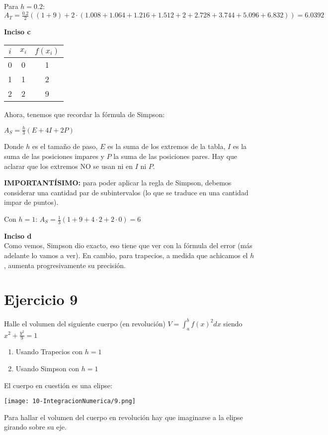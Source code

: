 \documentclass[11pt]{article}
\begin{document}
	Para $h=0.2$: $\displaystyle A_T=\frac{0.2}{2}((1+9)+2\cdot(1.008+1.064+1.216+1.512+2+2.728+3.744+5.096+6.832))=6.0392$
	
	\textbf{Inciso c}\\
	\begin{tabular}{|c|c|c|}
		\hline
		$i$ & $x_i$ & $f(x_i)$ \\
		\hline
		0 & 0 & 1 \\
		\hline
		1 & 1 & 2 \\
		\hline
		2 & 2 & 9 \\
		\hline
	\end{tabular}

	Ahora, tenemos que recordar la fórmula de Simpson:
	
	$\displaystyle A_S=\frac{h}{3}(E+4I+2P)$
	
	Donde $h$ es el tamaño de paso, $E$ es la suma de los extremos de la tabla, $I$ es la suma de las posiciones impares y $P$ la suma de las posiciones pares. Hay que aclarar que los extremos NO se usan ni en $I$ ni $P$.
	
	\textbf{IMPORTANTÍSIMO:} para poder aplicar la regla de Simpson, debemos considerar una cantidad par de subintervalos (lo que se traduce en una cantidad impar de puntos).
	
	Con $h=1$: $\displaystyle A_S=\frac{1}{3}(1+9+4\cdot 2 + 2\cdot 0)=6$
	
	\textbf{Inciso d}\\
	Como vemos, Simpson dio exacto, eso tiene que ver con la fórmula del error (más adelante lo vamos a ver). En cambio, para trapecios, a medida que achicamos el $h$, aumenta progresivamente su precisión.

	\section{Ejercicio 9}
	Halle el volumen del siguiente cuerpo (en revolución) $\displaystyle V=\int_{a}^{b}f(x)^2dx$ siendo $x^2+\frac{y^2}{9}=1$
	\begin{enumerate}[label=\alph*)]
		\item Usando Trapecios con $h=1$
		\item Usando Simpson con $h=1$
	\end{enumerate}

	El cuerpo en cuestión es una elipse:
	
	\texttt{[image: 10-IntegracionNumerica/9.png]}
	
	Para hallar el volumen del cuerpo en revolución hay que imaginarse a la elipse girando sobre su eje.
	
\end{document}
